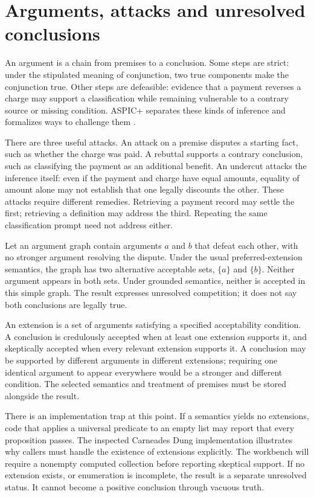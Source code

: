 \documentclass[12pt,a4paper,oneside,openany]{book}
\begin{document}
\section{Arguments, attacks and unresolved conclusions}
\label{merge:M05:04}


An argument is a chain from premises to a conclusion. Some steps are strict:
under the stipulated meaning of conjunction, two true components make the
conjunction true. Other steps are defeasible: evidence that a payment reverses a
charge may support a classification while remaining vulnerable to a contrary
source or missing condition. ASPIC+ separates these kinds of inference and
formalizes ways to challenge them \citep[sections 2--3]{aspic2010}.

There are three useful attacks. An attack on a premise disputes a starting fact,
such as whether the charge was paid. A rebuttal supports a contrary conclusion,
such as classifying the payment as an additional benefit. An undercut attacks the
inference itself: even if the payment and charge have equal amounts, equality of
amount alone may not establish that one legally discounts the other. These
attacks require different remedies. Retrieving a payment record may settle the
first; retrieving a definition may address the third. Repeating the same
classification prompt need not address either.

Let an argument graph contain arguments $a$ and $b$ that defeat each other, with
no stronger argument resolving the dispute. Under the usual preferred-extension
semantics, the graph has two alternative acceptable sets, $\{a\}$ and $\{b\}$.
Neither argument appears in both sets. Under grounded semantics, neither is
accepted in this simple graph. The result expresses unresolved competition; it
does not say both conclusions are legally true.

An extension is a set of arguments satisfying a specified acceptability
condition. A conclusion is credulously accepted when at least one extension
supports it, and skeptically accepted when every relevant extension supports it.
A conclusion may be supported by different arguments in different extensions;
requiring one identical argument to appear everywhere would be a stronger and
different condition. The selected semantics and treatment of premises must be
stored alongside the result.

There is an implementation trap at this point. If a semantics yields no
extensions, code that applies a universal predicate to an empty list may report
that every proposition passes. The inspected Carneades Dung implementation
illustrates why callers must handle the existence of extensions explicitly. The
workbench will require a nonempty computed collection before reporting skeptical
support. If no extension exists, or enumeration is incomplete, the result is a
separate unresolved status. It cannot become a positive conclusion through
vacuous truth.
\end{document}
